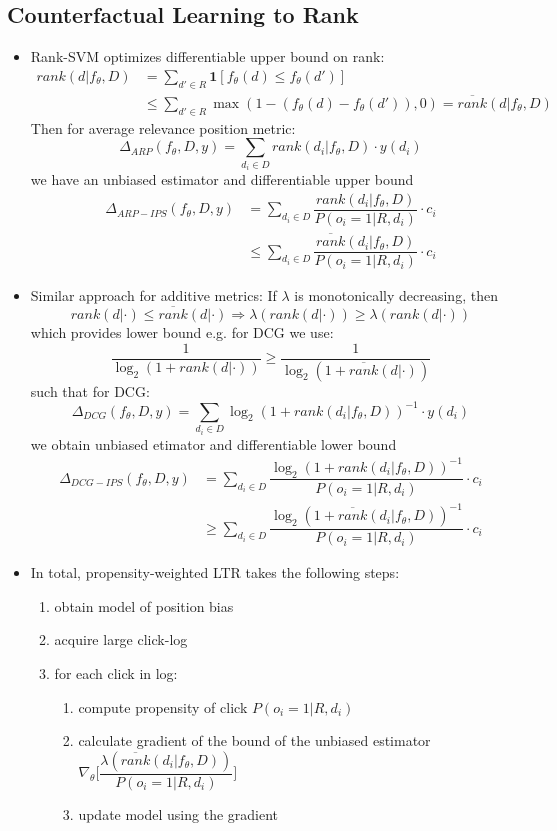 \subsection{Counterfactual Learning to Rank}
\begin{itemize}
	\item Rank-SVM optimizes differentiable upper bound on rank:
	\begin{align*}
		rank(d|f_\theta,D) &= \sum_{d' \in R} \mathbf{1} [f_\theta(d) \leq f_\theta(d')] \\
		&\leq \sum_{d' \in R} \max (1 - (f_\theta(d) - f_\theta(d')), 0) = \overline{rank}(d|f_\theta, D)
	\end{align*}
	Then for average relevance position metric:
	$$ \Delta_{ARP}(f_\theta,D,y) = \sum_{d_i \in D} rank(d_i |f_\theta,D) \cdot y(d_i) $$
	we have an unbiased estimator and differentiable upper bound
	\begin{align*}
		\Delta_{ARP-IPS}(f_\theta,D,y) &= \sum_{d_i \in D} \dfrac{rank(d_i |f_\theta,D)}{P(o_i = 1|R,d_i)} \cdot c_i \\
		&\leq \sum_{d_i \in D} \dfrac{\overline{rank}(d_i |f_\theta,D)}{P(o_i = 1|R,d_i)} \cdot c_i
	\end{align*}
	\item Similar approach for additive metrics:
	If $\lambda$ is monotonically decreasing, then 
	$$rank(d|\cdot) \leq \overline{rank}(d|\cdot) \Rightarrow \lambda(rank(d|\cdot)) \geq \lambda(rank(d|\cdot))$$
	which provides lower bound e.g. for DCG we use:
	$$\dfrac{1}{\log_2 (1 + rank(d|\cdot))} \geq \dfrac{1}{\log_2(1+ \overline{rank}(d|\cdot))}$$
	such that for DCG:
	$$\Delta_{DCG}(f_\theta,D,y) = \sum_{d_i \in D}\log_2(1 + rank(d_i|f_\theta,D))^{-1} \cdot y(d_i)$$
	we obtain unbiased etimator and differentiable lower bound
	\begin{align*}
		\Delta_{DCG-IPS}(f_\theta,D,y) &= \sum_{d_i \in D} \dfrac{\log_2(1 + rank(d_i|f_\theta,D))^{-1}}{P(o_i = 1|R,d_i)} \cdot c_i \\
		&\geq \sum_{d_i \in D} \dfrac{\log_2(1 + \overline{rank}(d_i|f_\theta,D))^{-1}}{P(o_i = 1|R,d_i)} \cdot c_i
	\end{align*}
	\item In total, propensity-weighted LTR takes the following steps:
	\begin{enumerate}
		\item obtain model of position bias
		\item acquire large click-log
		\item for each click in log:
		\begin{enumerate}
			\item compute propensity of click $P(o_i = 1|R,d_i)$
			\item calculate gradient of the bound of the unbiased estimator $\nabla_\theta \Big[ \dfrac{\lambda (\overline{rank}(d_i|f_\theta, D))}{P(o_i = 1|R,d_i)} \Big]$
			\item update model using the gradient
		\end{enumerate}
	\end{enumerate}
\end{itemize}
